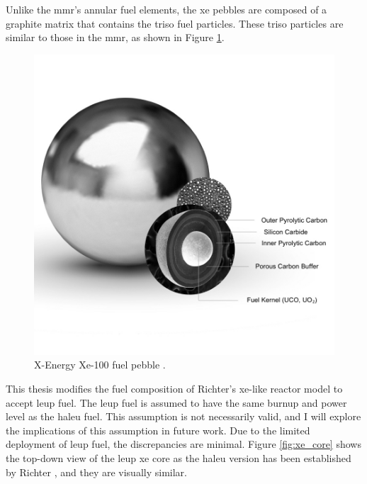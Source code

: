 Unlike the \gls{mmr}'s annular fuel elements, the \gls{xe} pebbles are composed of a graphite matrix that contains the \gls{triso} fuel particles. These \gls{triso} particles are similar to those in the \gls{mmr}, as shown in Figure \ref{fig:xe_fuel}.

\begin{figure}[H]
    \centering
    \includegraphics[scale=0.28]{images/reactor_design/graphic-triso-x-pebble.jpg}
    \caption{X-Energy Xe-100 fuel pebble \cite{xe_fuel}.}
    \label{fig:xe_fuel}
\end{figure}


This thesis modifies the fuel composition of Richter's \gls{xe}-like reactor model to accept \gls{leup} fuel. The \gls{leup} fuel is assumed to have the same burnup and power level as the \gls{haleu} fuel. This assumption is not necessarily valid, and I will explore the implications of this assumption in future work. Due to the limited deployment of \gls{leup} fuel, the discrepancies are minimal. Figure \ref{fig:xe_core} shows the top-down view of the \gls{leup} \gls{xe} core as the \gls{haleu} version has been established by Richter \cite{richter_thesis_2022}, and they are visually similar.


